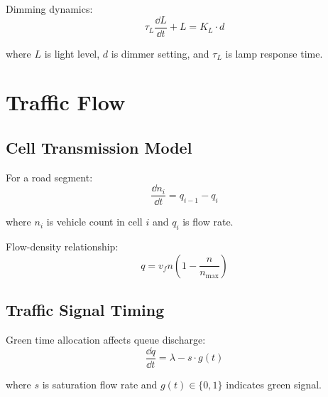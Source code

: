 Dimming dynamics:
\begin{equation}
\tau_L\frac{\dd L}{\dd t} + L = K_L \cdot d
\end{equation}

where $L$ is light level, $d$ is dimmer setting, and $\tau_L$ is lamp response time.

\section{Traffic Flow}
\label{sec:traffic}

\subsection{Cell Transmission Model}

For a road segment:
\begin{equation}
\frac{\dd n_i}{\dd t} = q_{i-1} - q_i
\end{equation}

where $n_i$ is vehicle count in cell $i$ and $q_i$ is flow rate.

Flow-density relationship:
\begin{equation}
q = v_f n \left(1 - \frac{n}{n_{\max}}\right)
\end{equation}

\subsection{Traffic Signal Timing}

Green time allocation affects queue discharge:
\begin{equation}
\frac{\dd q}{\dd t} = \lambda - s \cdot g(t)
\end{equation}

where $s$ is saturation flow rate and $g(t) \in \{0, 1\}$ indicates green signal.

